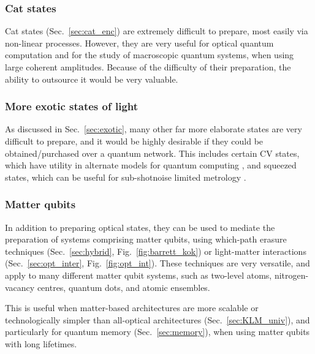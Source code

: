 \documentclass[aps,rmp,twocolumn,amsmath,amssymb,nofootinbib,superscriptaddress,longbibliography,floatfix]{revtex4-1}
\begin{document}
%
%

\subsubsection{Cat states}

Cat states (Sec.~\ref{sec:cat_enc}) are extremely difficult to prepare, most easily via non-linear processes. However, they are very useful for optical quantum computation and for the study of macroscopic quantum systems, when using large coherent amplitudes. Because of the difficulty of their preparation, the ability to outsource it would be very valuable.

%
%

\subsubsection{More exotic states of light}

As discussed in Sec.~\ref{sec:exotic}, many other far more elaborate states are very difficult to prepare, and it would be highly desirable if they could be obtained/purchased over a quantum network. This includes certain CV states, which have utility in alternate models for quantum computing \cite{bib:Menicucci06, Ralph, Lund}, and squeezed states, which can be useful for sub-shotnoise limited metrology \cite{???}.

%
%

\subsubsection{Matter qubits}

In addition to preparing optical states, they can be used to mediate the preparation of systems comprising matter qubits, using which-path erasure techniques (Sec.~\ref{sec:hybrid}, Fig.~\ref{fig:barrett_kok}) or light-matter interactions (Sec.~\ref{sec:opt_inter}, Fig.~\ref{fig:opt_int}). These techniques are very versatile, and apply to many different matter qubit systems, such as two-level atoms, nitrogen-vacancy centres, quantum dots, and atomic ensembles.

This is useful when matter-based architectures are more scalable or technologically simpler than all-optical architectures (Sec.~\ref{sec:KLM_univ}), and particularly for quantum memory (Sec.~\ref{sec:memory}), when using matter qubits with long lifetimes.

%
%
\end{document}
